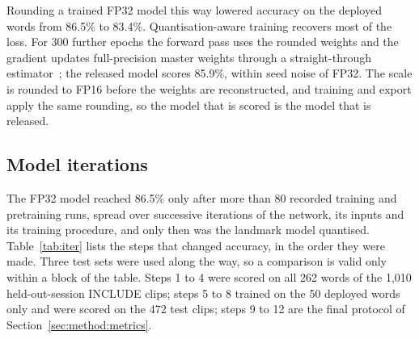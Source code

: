 \documentclass[pdflatex,sn-mathphys-num,onecolumn]{sn-jnl}
\theoremstyle{thmstyleone}%
\begin{document}
Rounding a trained FP32 model this way lowered accuracy on the deployed words from 86.5\% to 83.4\%. Quantisation-aware training recovers most of the loss. For 300 further epochs the forward pass uses the rounded weights and the gradient updates full-precision master weights through a straight-through estimator~\cite{bengio2013ste,jacob2018quant}; the released model scores 85.9\%, within seed noise of FP32. The scale is rounded to FP16 before the weights are reconstructed, and training and export apply the same rounding, so the model that is scored is the model that is released.

\subsection{Model iterations}

The FP32 model reached 86.5\% only after more than 80 recorded training and pretraining runs, spread over successive iterations of the network, its inputs and its training procedure, and only then was the landmark model quantised. Table~\ref{tab:iter} lists the steps that changed accuracy, in the order they were made. Three test sets were used along the way, so a comparison is valid only within a block of the table. Steps 1 to 4 were scored on all 262 words of the 1,010 held-out-session INCLUDE clips; steps 5 to 8 trained on the 50 deployed words only and were scored on the 472 test clips; steps 9 to 12 are the final protocol of Section~\ref{sec:method:metrics}.
\end{document}
